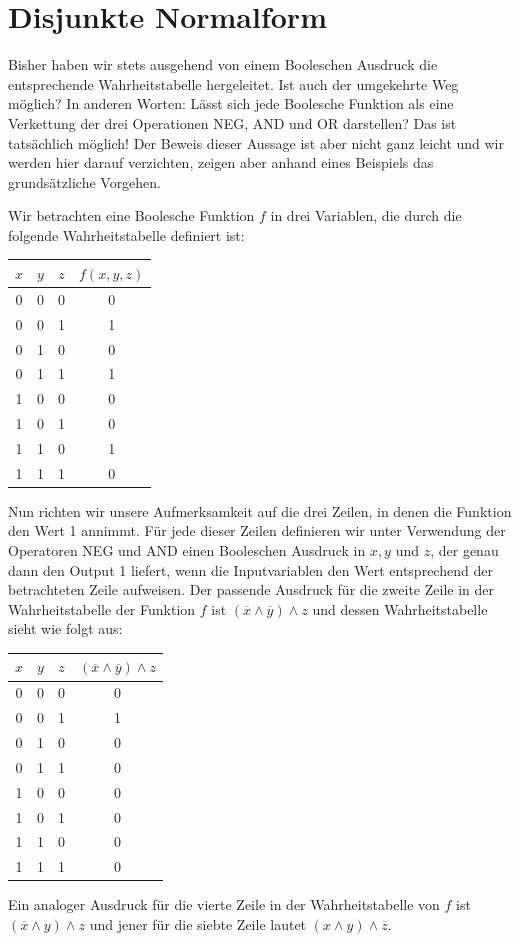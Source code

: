 \section{Disjunkte Normalform}
Bisher haben wir stets ausgehend von einem Booleschen Ausdruck die entsprechende Wahrheitstabelle hergeleitet. Ist auch der umgekehrte Weg möglich? In anderen Worten: Lässt sich jede Boolesche Funktion als eine Verkettung der drei Operationen NEG, AND und OR darstellen? Das ist tatsächlich möglich! Der Beweis dieser Aussage ist aber nicht ganz leicht und wir werden hier darauf verzichten, zeigen aber anhand eines Beispiels das grundsätzliche Vorgehen.
\begin{myexample}\label{myexample:dnf}
    Wir betrachten eine Boolesche Funktion $f$ in drei Variablen, die durch die folgende Wahrheitstabelle definiert ist:
    \begin{center}
        \begin{tabular}{c|c|c||c}
            $x$ & $y$ & $z$ & $f(x,y,z) $\\
            \hline
            0&0&0&0 \\
            0&0&1&1 \\
            0&1&0&0 \\
            0&1&1&1 \\
            1&0&0&0 \\
            1&0&1&0 \\
            1&1&0&1 \\
            1&1&1&0            
        \end{tabular}
    \end{center}
    Nun richten wir unsere Aufmerksamkeit auf die drei Zeilen, in denen die Funktion den Wert 1 annimmt. Für jede dieser Zeilen definieren wir unter Verwendung der Operatoren NEG und AND einen Booleschen Ausdruck in $x,y$ und $z$, der genau dann den Output 1 liefert, wenn die Inputvariablen den Wert entsprechend der betrachteten Zeile aufweisen. Der passende Ausdruck für die zweite Zeile in der Wahrheitstabelle der Funktion $f$ ist $(\overline{x} \wedge \overline{y}) \wedge z$ und dessen Wahrheitstabelle sieht wie folgt aus:
    \begin{center}
        \begin{tabular}{c|c|c||c}
            $x$ & $y$ & $z$ &  $(\overline{x} \wedge \overline{y}) \wedge z$\\
            \hline
            0&0&0&0 \\
            0&0&1&1 \\
            0&1&0&0 \\
            0&1&1&0 \\
            1&0&0&0 \\
            1&0&1&0 \\
            1&1&0&0 \\
            1&1&1&0            
        \end{tabular} 
    \end{center}
   Ein analoger Ausdruck für die vierte Zeile in der Wahrheitstabelle von $f$ ist $(\overline{x} \wedge y )\wedge z$ und jener für die siebte Zeile lautet $(x \wedge y) \wedge \overline{z}$. 


\end{myexample}

